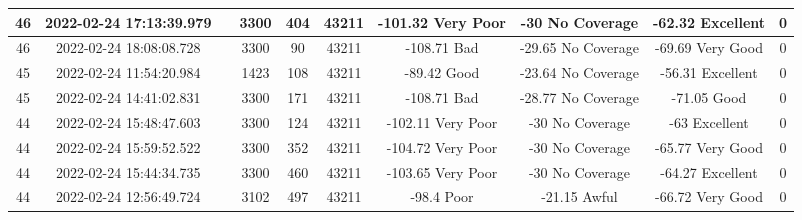\begin{longtable*}{|c|c|c|c|c|c|c|c|c|c|}
46&2022-02-24 17:13:39.979&&3300&404&43211& -101.32   Very Poor   & -30       No Coverage & -62.32    Excellent   & 0\\\hline
{}46&2022-02-24 18:08:08.728&&3300&90&43211& -108.71   Bad         & -29.65    No Coverage & -69.69    Very Good   & 0\\\hline
{}45&2022-02-24 11:54:20.984&&1423&108&43211& -89.42    Good        & -23.64    No Coverage & -56.31    Excellent   & 0\\\hline
{}45&2022-02-24 14:41:02.831&&3300&171&43211& -108.71   Bad         & -28.77    No Coverage & -71.05    Good        & 0\\\hline
{}44&2022-02-24 15:48:47.603&&3300&124&43211& -102.11   Very Poor   & -30       No Coverage & -63       Excellent   & 0\\\hline
{}44&2022-02-24 15:59:52.522&&3300&352&43211& -104.72   Very Poor   & -30       No Coverage & -65.77    Very Good   & 0\\\hline
{}44&2022-02-24 15:44:34.735&&3300&460&43211& -103.65   Very Poor   & -30       No Coverage & -64.27    Excellent   & 0\\\hline
{}44&2022-02-24 12:56:49.724&&3102&497&43211& -98.4     Poor        & -21.15    Awful       & -66.72    Very Good   & 0\\\hline

\end{longtable*}
